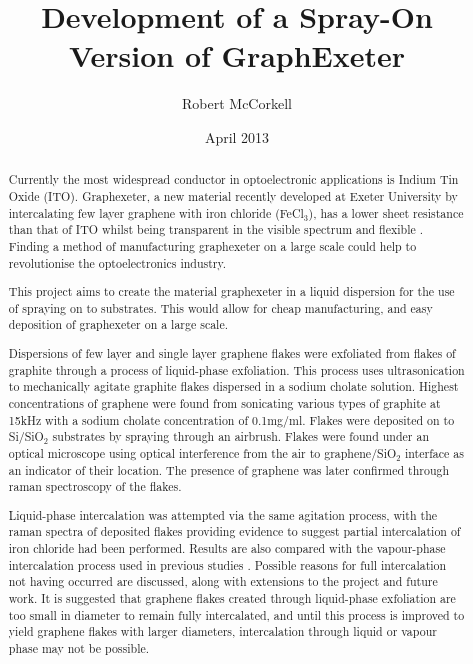 \documentclass[12pt,titlepage]{article}
\begin{document}
	\title{Development of a Spray-On Version of GraphExeter}
	\author{Robert McCorkell}
	\date{April 2013}
	\maketitle
	
	\begin{abstract}
		\setcounter{page}{2}
		Currently the most widespread conductor in optoelectronic applications is Indium Tin Oxide (ITO). Graphexeter, a new material recently developed at Exeter University by intercalating few layer graphene with iron chloride (FeCl$_3$), has a lower sheet resistance than that of ITO whilst being transparent in the visible spectrum and flexible \cite{Khrapach2012a}. Finding a method of manufacturing graphexeter on a large scale could help to revolutionise the optoelectronics industry. 
		
		This project aims to create the material graphexeter in a liquid dispersion for the use of spraying on to substrates. This would allow for cheap manufacturing, and easy deposition of graphexeter on a large scale.
	
		Dispersions of few layer and single layer graphene flakes were exfoliated from flakes of graphite through a process of liquid-phase exfoliation. This process uses ultrasonication to mechanically agitate graphite flakes dispersed in a sodium cholate solution. Highest concentrations of graphene were found from sonicating various types of graphite at 15kHz with a sodium cholate concentration of 0.1mg/ml. Flakes were deposited on to Si/SiO$_2$ substrates by spraying through an airbrush. Flakes were found under an optical microscope using optical interference from the air to graphene/SiO$_2$ interface as an indicator of their location. The presence of graphene was later confirmed through raman spectroscopy of the flakes.
		
		Liquid-phase intercalation was attempted via the same agitation process, with the raman spectra of deposited flakes providing evidence to suggest partial intercalation of iron chloride had been performed. Results are also compared with the vapour-phase intercalation process used in previous studies \cite{Khrapach2012a}. Possible reasons for full intercalation not having occurred are discussed, along with extensions to the project and future work. It is suggested that graphene flakes created through liquid-phase exfoliation are too small in diameter to remain fully intercalated, and until this process is improved to yield graphene flakes with larger diameters, intercalation through liquid or vapour phase may not be possible.
		
	\end{abstract}
	
\end{document}
